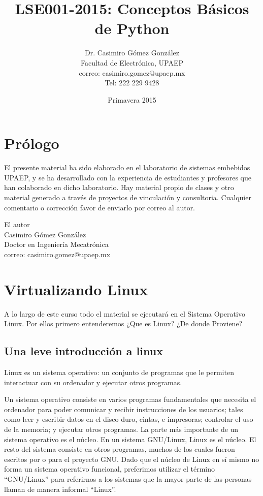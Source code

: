 \documentclass[12pt, twoside]{report}
\title{LSE001-2015: Conceptos Básicos de Python}
\author{Dr. Casimiro Gómez González\\
	Facultad de Electrónica, UPAEP\\
               correo: casimiro.gomez@upaep.mx\\
               Tel: 222 229 9428}
\date{Primavera 2015}
\begin{document}
\maketitle

\chapter*{Prólogo}

El presente material ha sido elaborado en el laboratorio de sistemas embebidos UPAEP, y se ha desarrollado con la experiencia de estudiantes y profesores que han colaborado en dicho laboratorio. Hay material propio de clases y otro material generado a través de proyectos de vinculación y consultoria. Cualquier comentario o corrección favor de enviarlo por correo al autor.

\begin{flushright}
	
	El autor\\
	Casimiro Gómez González\\
	Doctor en Ingeniería Mecatrónica \\
	correo: casimiro.gomez@upaep.mx
\end{flushright}

\tableofcontents


\chapter{Virtualizando Linux}

A lo largo de este curso todo el material se ejecutará en el Sistema Operativo Linux. Por ellos primero entenderemos ¿Que es Linux? ¿De donde Proviene?

\section{Una leve introducción a linux}

Linux es un sistema operativo: un conjunto de programas que le permiten interactuar con su ordenador y ejecutar otros programas.

Un sistema operativo consiste en varios programas fundamentales que necesita el ordenador para poder comunicar y recibir instrucciones de los usuarios; tales como leer y escribir datos en el disco duro, cintas, e impresoras; controlar el uso de la memoria; y ejecutar otros programas. La parte más importante de un sistema operativo es el núcleo. En un sistema GNU/Linux, Linux es el núcleo. El resto del sistema consiste en otros programas, muchos de los cuales fueron escritos por o para el proyecto GNU. Dado que el núcleo de Linux en sí mismo no forma un sistema operativo funcional, preferimos utilizar el término ``GNU/Linux'' para referirnos a los sistemas que la mayor parte de las personas llaman de manera informal ``Linux''.
\end{document}
